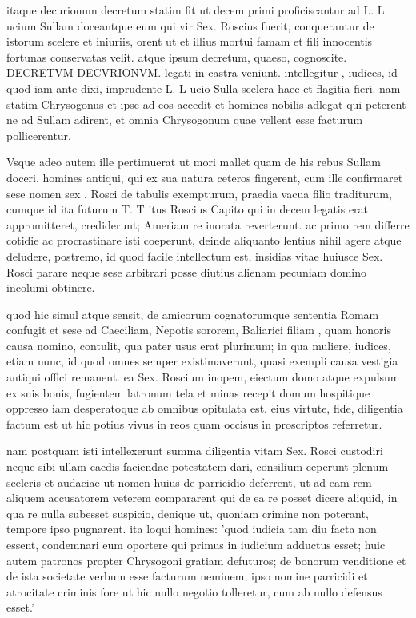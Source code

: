  itaque decurionum decretum statim fit ut decem primi proficiscantur ad L. L ucium Sullam doceantque eum qui vir Sex. Roscius fuerit, conquerantur de istorum scelere et iniuriis, orent ut et illius mortui famam et fili innocentis fortunas conservatas velit. atque ipsum decretum, quaeso, cognoscite. DECRETVM DECVRIONVM. legati in castra veniunt. intellegitur , iudices, id quod iam ante dixi, imprudente L. L ucio Sulla scelera haec et flagitia fieri. nam statim Chrysogonus et ipse ad eos accedit et homines nobilis adlegat qui peterent ne ad Sullam adirent, et omnia Chrysogonum quae vellent esse facturum pollicerentur.

 Vsque adeo autem ille pertimuerat ut mori mallet quam de his rebus Sullam doceri. homines antiqui, qui ex sua natura ceteros fingerent, cum ille confirmaret sese nomen sex . Rosci de tabulis exempturum, praedia vacua filio traditurum, cumque id ita futurum T. T itus Roscius Capito qui in decem legatis erat appromitteret, crediderunt; Ameriam re inorata reverterunt. ac primo rem differre cotidie ac procrastinare isti coeperunt, deinde aliquanto lentius nihil agere atque deludere, postremo, id quod facile intellectum est, insidias vitae huiusce Sex. Rosci parare neque sese arbitrari posse diutius alienam pecuniam domino incolumi obtinere.

 quod hic simul atque sensit, de amicorum cognatorumque sententia Romam confugit et sese ad Caeciliam, Nepotis sororem, Baliarici filiam , quam honoris causa nomino, contulit, qua pater usus erat plurimum; in qua muliere, iudices, etiam nunc, id quod omnes semper existimaverunt, quasi exempli causa vestigia antiqui offici remanent. ea Sex. Roscium inopem, eiectum domo atque expulsum ex suis bonis, fugientem latronum tela et minas recepit domum hospitique oppresso iam desperatoque ab omnibus opitulata est. eius virtute, fide, diligentia factum est ut hic potius vivus in reos quam occisus in proscriptos referretur.

 nam postquam isti intellexerunt summa diligentia vitam Sex. Rosci custodiri neque sibi ullam caedis faciendae potestatem dari, consilium ceperunt plenum sceleris et audaciae ut nomen huius de parricidio deferrent, ut ad eam rem aliquem accusatorem veterem compararent qui de ea re posset dicere aliquid, in qua re nulla subesset suspicio, denique ut, quoniam crimine non poterant, tempore ipso pugnarent. ita loqui homines: 'quod iudicia tam diu facta non essent, condemnari eum oportere qui primus in iudicium adductus esset; huic autem patronos propter Chrysogoni gratiam defuturos; de bonorum venditione et de ista societate verbum esse facturum neminem; ipso nomine parricidi et atrocitate criminis fore ut hic nullo negotio tolleretur, cum ab nullo defensus esset.'

